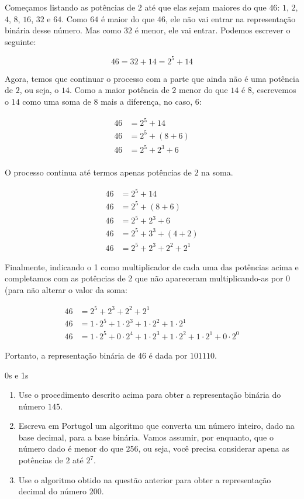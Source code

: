 Começamos listando as potências de $2$ até que elas sejam maiores do que $46$: $1$, $2$, $4$, $8$, $16$, $32$ e $64$. Como $64$ é maior do que $46$, ele não vai entrar na representação binária desse número. Mas como $32$ é menor, ele vai entrar. Podemos escrever o seguinte:

\begin{equation*}
46=32+14=2^5+14
\end{equation*}

Agora, temos que continuar o processo com a parte que ainda não é uma potência de $2$, ou seja, o $14$. Como a maior potência de $2$ menor do que $14$ é $8$, escrevemos o $14$ como uma soma de 8 mais a diferença, no caso, $6$:

\begin{align*}
46&=2^5+14 \\
46&=2^5+(8+6) \\
46&=2^5+2^3+6 \\
\end{align*}
 
O processo continua até termos apenas potências de $2$ na soma.

\begin{align*}
46&=2^5+14 \\
46&=2^5+(8+6) \\
46&=2^5+2^3+6 \\
46&=2^5+3^3+(4+2) \\
46&=2^5+2^3+2^2+2^1
\end{align*}
 
Finalmente, indicando o 1 como multiplicador de cada uma das potências acima e completamos com as potências de 2 que não apareceram multiplicando-as por 0 (para não alterar o valor da soma:

\begin{align*}
46&=2^5+2^3+2^2+2^1 \\
46&=1\cdot2^5+1\cdot2^3+1\cdot2^2+1\cdot2^1 \\
46&=1\cdot2^5+0\cdot2^4+1\cdot2^3+1\cdot2^2+1\cdot2^1+0\cdot2^0
\end{align*}
 
Portanto, a representação binária de $46$ é dada por $101110$.

\begin{task}{0s e 1s}
\begin{enumerate}
\item Use o procedimento descrito acima para obter a representação binária do número $145$.

\item Escreva em Portugol um algoritmo que converta um número inteiro, dado na base decimal, para a base binária. Vamos assumir, por enquanto, que o número dado é menor do que $256$, ou seja, você precisa considerar apena as potências de $2$ até $2^7$.

\item Use o algoritmo obtido na questão anterior para obter a representação decimal do número $200$.
\end{enumerate}
\end{task}

